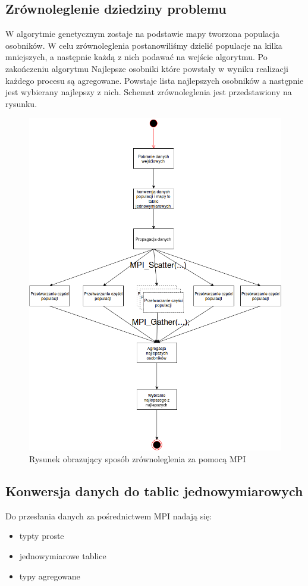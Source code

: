 \documentclass[10pt,a4paper]{article}
\begin{document}
\subsection{Zrównoleglenie dziedziny problemu}
W algorytmie genetycznym zostaje na podstawie mapy tworzona populacja osobników. W celu zrównoleglenia postanowiliśmy dzielić populacje na kilka mniejszych, a następnie każdą z nich podawać na wejście algorytmu. Po zakończeniu algorytmu Najlepsze osobniki które powstały w wyniku realizacji każdego procesu są agregowane. Powstaje lista najlepszych osobników a następnie jest wybierany najlepszy z nich. Schemat zrównoleglenia jest przedstawiony na rysunku.

\begin{figure}[H]
\includegraphics[scale=0.5]{mpi_flow.png}
\centering
\caption{\label{fig:flowMpi}Rysunek obrazujący sposób zrównoleglenia za pomocą MPI}
\end{figure}

\subsection{Konwersja danych do tablic jednowymiarowych}
Do przesłania danych za pośrednictwem MPI nadają się:
\begin{itemize}
\item typty proste
\item jednowymiarowe tablice
\item typy agregowane
\end{itemize}
\end{document}
